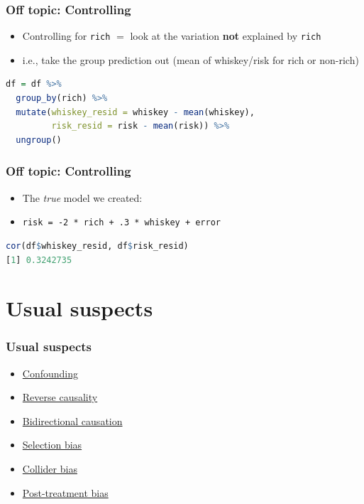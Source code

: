 \begin{frame}[fragile]
\frametitle{Off topic: Controlling}
\centering

\begin{itemize}
  \item Controlling for \texttt{rich} $=$ look at the variation \textbf{not} explained by \texttt{rich}
  \item i.e., take the group prediction out (mean of whiskey/risk for rich or non-rich)
\end{itemize}

\begin{lstlisting}[language=R]
df = df %>%
  group_by(rich) %>%
  mutate(whiskey_resid = whiskey - mean(whiskey),
         risk_resid = risk - mean(risk)) %>%
  ungroup()
\end{lstlisting}

\end{frame}
\note{}

\begin{frame}[fragile]
\frametitle{Off topic: Controlling}
\centering

\begin{itemize}
  \item The \textit{true} model we created:
  \item[] \texttt{risk = -2 * rich + .3 * whiskey + error}
\end{itemize}

\begin{lstlisting}[language=R]
cor(df$whiskey_resid, df$risk_resid)
[1] 0.3242735
\end{lstlisting}

\end{frame}
\note{}

\section{Usual suspects}

\begin{frame}
\frametitle{Usual suspects}
\centering

\begin{itemize}
  \item \hyperlink{confounding}{Confounding}
  \item \hyperlink{reverse}{Reverse causality}
  \item \hyperlink{bidirect}{Bidirectional causation}
  \item \hyperlink{selectbias}{Selection bias}
  \item \hyperlink{collider}{Collider bias}
  \item \hyperlink{ptbias}{Post-treatment bias}
\end{itemize}

\end{frame}
\note{}

